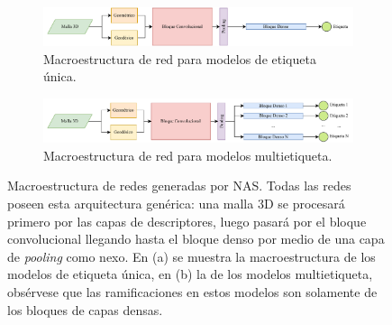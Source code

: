 \begin{figure}[h]
    \begin{subfigure}{\textwidth}
        \centering
        \includegraphics[width=\linewidth]{figures/4_materials-methods/NAS_sample1.pdf}
        \caption{Macroestructura de red para modelos de etiqueta única.}
        \label{single_label_nets}
    \end{subfigure}

    \begin{subfigure}{\textwidth}
        \centering
        \includegraphics[width=\linewidth]{figures/4_materials-methods/NAS_sample2.pdf}
        \caption{Macroestructura de red para modelos multietiqueta.}
        \label{multi_label_nets}
    \end{subfigure}
    \caption[Macroestructura de redes generadas por NAS]{Macroestructura de redes generadas por NAS. Todas las redes poseen esta arquitectura genérica: una malla 3D se procesará primero por las capas de descriptores, luego pasará por el bloque convolucional llegando hasta el bloque denso por medio de una capa de \textit{pooling} como nexo. En (a) se muestra la macroestructura de los modelos de etiqueta única, en (b) la de los modelos multietiqueta, obsérvese que las ramificaciones en estos modelos son solamente de los bloques de capas densas.}
    \label{nas_macrostruct}
\end{figure}


